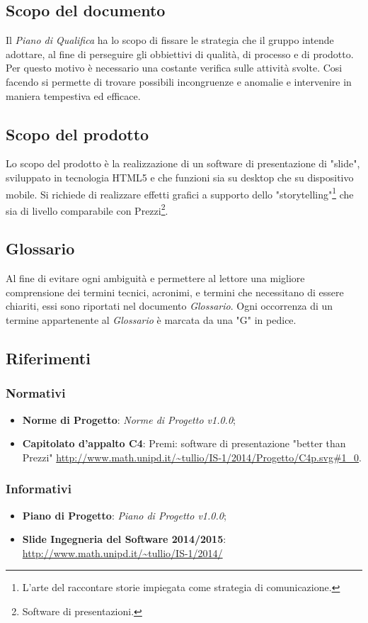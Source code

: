 \subsection{Scopo del documento}
Il \textit{Piano di Qualifica} ha lo scopo di fissare le strategia che il gruppo intende adottare, al fine di perseguire gli obbiettivi di qualità, di processo e di prodotto. Per questo motivo è necessario una costante verifica sulle attività svolte. Cosi facendo si permette di trovare possibili incongruenze e anomalie e intervenire in maniera tempestiva ed efficace.
\subsection{Scopo del prodotto}
Lo scopo del prodotto è la realizzazione di un software di presentazione di "slide", sviluppato in tecnologia HTML5 e che funzioni sia su desktop che su dispositivo mobile. Si richiede di realizzare effetti grafici a supporto dello "storytelling"\footnote{L'arte del raccontare storie impiegata come strategia di comunicazione.} che sia di livello comparabile con Prezzi\footnote{Software di presentazioni.}.
\subsection{Glossario}
Al fine di evitare ogni ambiguità e permettere al lettore una migliore comprensione dei termini tecnici, acronimi, e termini che necessitano di essere chiariti,  essi sono riportati nel documento \textit{Glossario}. 
Ogni occorrenza  di un termine appartenente al \textit{Glossario} è marcata da una "G" in pedice.
\subsection{Riferimenti}
	\subsubsection{Normativi}
	\begin{itemize}
		\item \textbf{Norme di Progetto}: \textit{Norme di Progetto v1.0.0};
		\item \textbf{Capitolato d'appalto C4}: Premi: software di presentazione "better than Prezzi" \url{http://www.math.unipd.it/~tullio/IS-1/2014/Progetto/C4p.svg#1_0}.
	\end{itemize}
	\subsubsection{Informativi}
	\begin{itemize}
		\item \textbf{Piano di Progetto}: \textit{Piano di Progetto v1.0.0};
		\item \textbf{Slide Ingegneria del Software 2014/2015}: \url{http://www.math.unipd.it/~tullio/IS-1/2014/}
	\end{itemize}